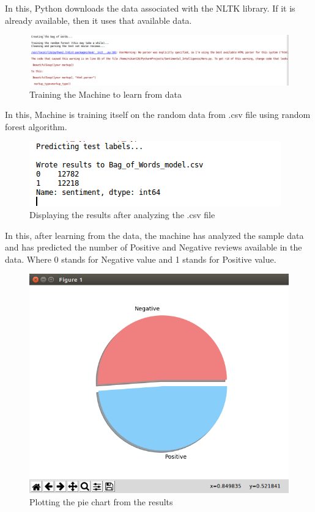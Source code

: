 In this, Python downloads the data associated with the NLTK library. If it is already available, then it uses that available data.\\
\begin{figure}[h]
	\centering
	\includegraphics[width=1\linewidth]{3rd}
	\caption{Training the Machine to learn from data}
\end{figure} 

In this, Machine is training itself on the random data from .csv file using random forest algorithm.
\begin{figure}[h]
	\centering
	\includegraphics[width=1\linewidth]{4th}
	\caption{Displaying the results after analyzing the .csv file}
\end{figure}

In this, after learning from the data, the machine has analyzed the sample data and has predicted the number of Positive and Negative reviews available in the data. Where 0 stands for Negative value and 1 stands for Positive value.\\
\begin{figure}[h]
	\centering
	\includegraphics[width=1\linewidth]{5th}
	\caption{Plotting the pie chart from the results}
\end{figure}

